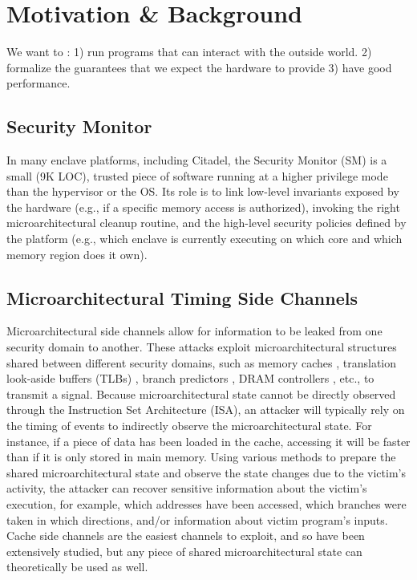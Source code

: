 \section{Motivation \& Background}

We want to : 1) run programs that can interact with the outside world.
2) formalize the guarantees that we expect the hardware to provide
3) have good performance.

\subsection{Security Monitor}
\label{sec:securitymonitor}
In many enclave platforms, including Citadel, the Security Monitor (SM) \cite{costan2016sanctum} \cite{lebedev2019sanctorum} is a small (9K LOC), trusted piece of software running at a higher privilege mode than the hypervisor or the OS.
Its role is to link low-level invariants exposed by the hardware (e.g., if a specific memory access is authorized), invoking the right microarchitectural cleanup routine, and the high-level security policies defined by the platform (e.g., which enclave is currently executing on which core and which memory region does it own).

\subsection{Microarchitectural Timing Side Channels}
Microarchitectural side channels allow for information to be leaked from one security domain to another.
These attacks exploit microarchitectural structures shared between different security domains, such as memory caches \cite{gotzfried2017cache, brasser2017software}, translation look-aside buffers (TLBs) \cite{gras2018translation}, branch predictors \cite{evtyushkin2018branchscope, aciiccmez2006predicting}, DRAM controllers \cite{wang2014timing}, etc., to transmit a signal.
Because microarchitectural state cannot be directly observed through the Instruction Set Architecture (ISA), an attacker will typically rely on the timing of events to indirectly observe the microarchitectural state.
For instance, if a piece of data has been loaded in the cache, accessing it will be faster than if it is only stored in main memory.
Using various methods to prepare the shared microarchitectural state and observe the state changes due to the victim's activity, the attacker can recover sensitive information  about the victim's execution, for example, which addresses have been accessed, which branches were taken in which directions, and/or information about victim program's inputs.
Cache side channels are the easiest channels to exploit, and so have been extensively studied, but any piece of shared microarchitectural state can theoretically be used as well.

